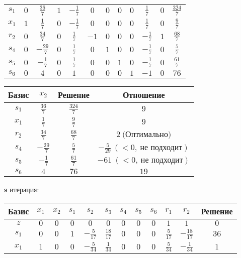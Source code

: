 \documentclass{article}%
\begin{document}
\begin{flushleft}
\begin{tabular}{|c|cccccccccc|c|}
\hline%
$s_{1}$&$0$&$\frac{36}{7}$&$1$&$-\frac{1}{7}$&$0$&$0$&$0$&$0$&$\frac{1}{7}$&$0$&$\frac{324}{7}$\\%
$x_{1}$&$1$&$\frac{1}{7}$&$0$&$-\frac{1}{7}$&$0$&$0$&$0$&$0$&$\frac{1}{7}$&$0$&$\frac{9}{7}$\\%
$r_{2}$&$0$&$\frac{34}{7}$&$0$&$\frac{1}{7}$&$-1$&$0$&$0$&$0$&$-\frac{1}{7}$&$1$&$\frac{68}{7}$\\%
$s_{4}$&$0$&$-\frac{29}{7}$&$0$&$\frac{1}{7}$&$0$&$1$&$0$&$0$&$-\frac{1}{7}$&$0$&$\frac{5}{7}$\\%
$s_{5}$&$0$&$-\frac{1}{7}$&$0$&$\frac{1}{7}$&$0$&$0$&$1$&$0$&$-\frac{1}{7}$&$0$&$\frac{61}{7}$\\%
$s_{6}$&$0$&$4$&$0$&$1$&$0$&$0$&$0$&$1$&$-1$&$0$&$76$\\%
\hline%
\end{tabular}%
\newline%
\newline%
\newline%
\begin{tabular}{|cccc|}%
\hline%
Базис&$x_{2}$&Решение&Отношение\\%
\hline%
$s_{1}$&$\frac{36}{7}$&$\frac{324}{7}$&$9$\\%
$x_{1}$&$\frac{1}{7}$&$\frac{9}{7}$&$9$\\%
$r_{2}$&$\frac{34}{7}$&$\frac{68}{7}$&$2\: \text{(Оптимально)}$\\%
$s_{4}$&$-\frac{29}{7}$&$\frac{5}{7}$&$-\frac{5}{29}\: (< 0, \: \text{не подходит})$\\%
$s_{5}$&$-\frac{1}{7}$&$\frac{61}{7}$&$-61\: (< 0, \: \text{не подходит})$\\%
$s_{6}$&$4$&$76$&$19$\\%
\hline%
\end{tabular}%
\newline%
\newline%
я итерация: %
\newline%
\newline%
\renewcommand{\arraystretch}{1.3}%
\begin{tabular}{|c|cccccccccc|c|}%
\hline%
Базис&$x_{1}$&$x_{2}$&$s_{1}$&$s_{2}$&$s_{3}$&$s_{4}$&$s_{5}$&$s_{6}$&$r_{1}$&$r_{2}$&Решение\\%
\hline%
$z$&$0$&$0$&$0$&$0$&$0$&$0$&$0$&$0$&$1$&$1$&$0$\\%
\hline%
$s_{1}$&$0$&$0$&$1$&$-\frac{5}{17}$&$\frac{18}{17}$&$0$&$0$&$0$&$\frac{5}{17}$&$-\frac{18}{17}$&$36$\\%
$x_{1}$&$1$&$0$&$0$&$-\frac{5}{34}$&$\frac{1}{34}$&$0$&$0$&$0$&$\frac{5}{34}$&$-\frac{1}{34}$&$1$\\%

\end{tabular}
\end{flushleft}
\end{document}
